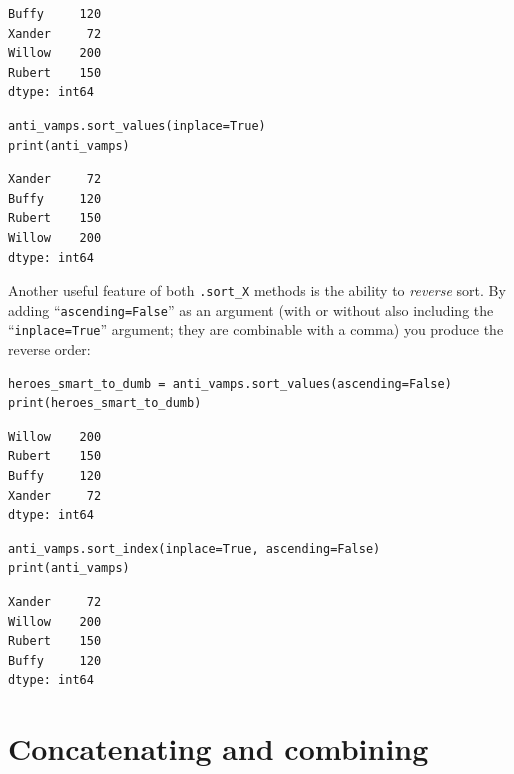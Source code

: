 \begin{Verbatim}[fontsize=\small,samepage=true,frame=leftline,framesep=5mm,framerule=1mm]
Buffy     120
Xander     72
Willow    200
Rubert    150
dtype: int64
\end{Verbatim}

\begin{Verbatim}[fontsize=\small,samepage=true,frame=single,framesep=3mm]
anti_vamps.sort_values(inplace=True)
print(anti_vamps)
\end{Verbatim}
\vspace{-.3in}

\begin{Verbatim}[fontsize=\small,samepage=true,frame=leftline,framesep=5mm,framerule=1mm]
Xander     72
Buffy     120
Rubert    150
Willow    200
dtype: int64
\end{Verbatim}

Another useful feature of both \texttt{.sort\_X} methods is the ability to
\textit{reverse} sort. By adding ``\texttt{ascending=False}'' as an argument
(with or without also including the ``\texttt{inplace=True}'' argument; they
are combinable with a comma) you produce the reverse order:

\begin{Verbatim}[fontsize=\small,samepage=true,frame=single,framesep=3mm]
heroes_smart_to_dumb = anti_vamps.sort_values(ascending=False)
print(heroes_smart_to_dumb)
\end{Verbatim}
\vspace{-.3in}

\begin{Verbatim}[fontsize=\small,samepage=true,frame=leftline,framesep=5mm,framerule=1mm]
Willow    200
Rubert    150
Buffy     120
Xander     72
dtype: int64
\end{Verbatim}

\begin{Verbatim}[fontsize=\small,samepage=true,frame=single,framesep=3mm]
anti_vamps.sort_index(inplace=True, ascending=False)
print(anti_vamps)
\end{Verbatim}
\vspace{-.3in}

\begin{Verbatim}[fontsize=\small,samepage=true,frame=leftline,framesep=5mm,framerule=1mm]
Xander     72
Willow    200
Rubert    150
Buffy     120
dtype: int64
\end{Verbatim}

\section{Concatenating and combining}

